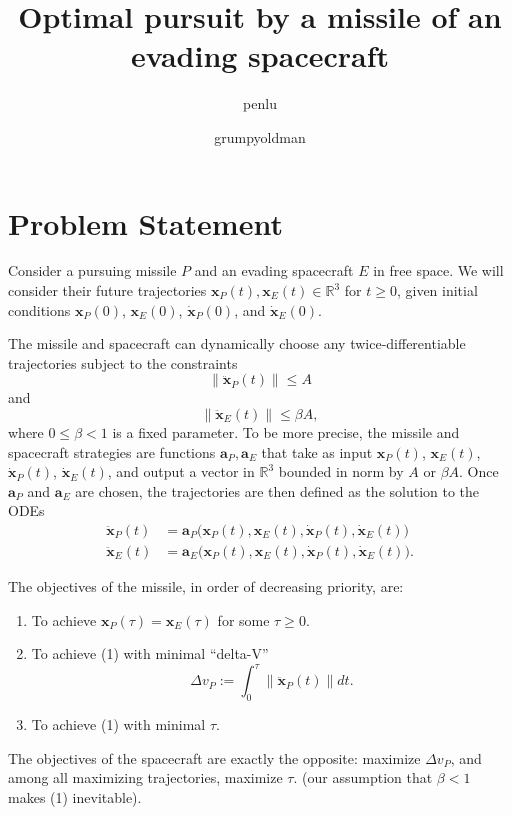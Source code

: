 \documentclass{article}
\newcommand{\eqdef}{:=}
\renewcommand{\vec}[1]{\mathbf{#1}}
\begin{document}
\title{Optimal pursuit by a missile of an evading spacecraft}
\author{penlu \and grumpyoldman}

\maketitle

\section{Problem Statement}
\newcommand{\R}{\mathbb{R}}

Consider a pursuing missile $P$ and an evading spacecraft $E$ in free space.  We
will consider their future trajectories $\vec{x}_P(t), \vec{x}_E(t) \in \R^3$ for $t \ge 0$,
given initial conditions $\vec{x}_P(0)$, $\vec{x}_E(0)$, $\dot{\vec{x}}_P(0)$, and $\dot{\vec{x}}_E(0)$.

The missile and spacecraft can dynamically choose any twice-differentiable trajectories
subject to the constraints \begin{equation}
  \|
  \ddot{\vec{x}}_P(t) \| \le A
\end{equation}
and
\begin{equation}
    \|
  \ddot{\vec{x}}_E(t) \| \le \beta A,
\end{equation}
where $0 \le \beta < 1$ is a fixed parameter.  To be more precise, the missile
and spacecraft strategies are functions $\vec{a}_P, \vec{a}_E$ that take as
input $\vec{x}_P(t)$, $\vec{x}_E(t)$, $\dot{\vec{x}}_P(t)$,
$\dot{\vec{x}}_E(t)$, and output a vector in $\R^3$ bounded in norm by $A$ or
$ \beta A$.  Once $\vec{a}_P$ and $\vec{a}_E$ are chosen, the trajectories are
then defined as the solution to the ODEs
\begin{align}
  \ddot{\vec{x}}_P(t) &= \vec{a}_P \big (\vec{x}_P(t), \vec{x}_E(t),
                        \dot{\vec{x}}_P(t), \dot{\vec{x}}_E(t) \big )\\
  \ddot{\vec{x}}_E(t) &= \vec{a}_E\big (\vec{x}_P(t), \vec{x}_E(t),
                        \dot{\vec{x}}_P(t), \dot{\vec{x}}_E(t) \big ).
\end{align}

The objectives of the missile, in order of decreasing priority, are:
\begin{enumerate}
\item To achieve $\vec{x}_P(\tau) = \vec{x}_E(\tau)$
for some $\tau \ge 0$.
\item To achieve (1) with minimal ``delta-V''
\begin{equation}
  \label{eq:missile-delta-v}
  \Delta v_P \eqdef \int_{0}^\tau \big \| \ddot{\vec{x}}_P(t) \big \| dt.
\end{equation}
\item To achieve (1) with minimal $\tau$.
\end{enumerate}
The objectives of the spacecraft are exactly the opposite: maximize $\Delta v_P$, and among all
maximizing trajectories, maximize $\tau$. (our assumption
that $\beta < 1$ makes (1) inevitable).
\end{document}
